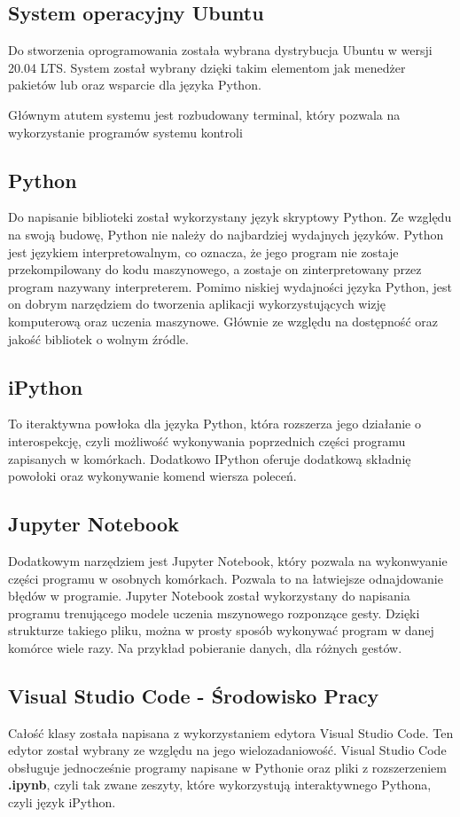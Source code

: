 \subsection{System operacyjny Ubuntu}
\quad Do stworzenia oprogramowania została wybrana dystrybucja Ubuntu w wersji 20.04 LTS. System został wybrany dzięki takim elementom jak menedżer pakietów lub oraz wsparcie dla języka Python. 

\quad Głównym atutem systemu jest rozbudowany terminal, który pozwala na wykorzystanie programów systemu kontroli 

\subsection{Python}
\quad Do napisanie biblioteki został wykorzystany język skryptowy Python. Ze względu na swoją budowę, Python nie należy do najbardziej wydajnych języków. Python jest językiem interpretowalnym, co oznacza, że jego program nie zostaje przekompilowany do kodu maszynowego, a zostaje on zinterpretowany przez program nazywany interpreterem. 
\quad Pomimo niskiej wydajności języka Python, jest on dobrym narzędziem do tworzenia aplikacji wykorzystujących wizję komputerową oraz uczenia maszynowe. Głównie ze względu na dostępność oraz jakość bibliotek o wolnym źródle.  

\subsection{iPython}
\quad To iteraktywna powłoka dla języka Python, która rozszerza jego działanie o interospekcję, czyli możliwość wykonywania poprzednich części programu zapisanych w komórkach. Dodatkowo IPython oferuje dodatkową składnię powołoki oraz wykonywanie komend wiersza poleceń. 

\subsection{Jupyter Notebook}
\quad Dodatkowym narzędziem jest Jupyter Notebook, który pozwala na wykonwyanie części programu w osobnych komórkach. Pozwala to na łatwiejsze odnajdowanie błędów w programie.
\quad Jupyter Notebook został wykorzystany do napisania programu trenującego modele uczenia mszynowego rozponzące gesty. Dzięki strukturze takiego pliku, można w prosty sposób wykonywać program w danej komórce wiele razy. Na przykład pobieranie danych, dla różnych gestów. 

\subsection{Visual Studio Code - Środowisko Pracy}
\quad Całość klasy została napisana z wykorzystaniem edytora Visual Studio Code. Ten edytor został wybrany ze względu na jego wielozadaniowość. Visual Studio Code obsługuje jednocześnie programy napisane w Pythonie oraz pliki z rozszerzeniem \textbf{.ipynb}, czyli tak zwane zeszyty, które wykorzystują interaktywnego Pythona, czyli język iPython. 

